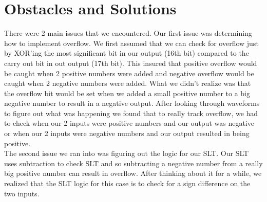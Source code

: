 \documentclass[11pt]{article}
\begin{document}
\section*{Obstacles and Solutions}
There were 2 main issues that we encountered. Our first issue was determining how to implement overflow. We first assumed that we can check for overflow just by XOR'ing the most significant bit in our output (16th bit) compared to the carry out bit  in out output (17th bit). This insured that positive overflow would be caught when 2 positive numbers were added and negative overflow would be caught when 2 negative numbers were added. What we didn't realize was that the overflow bit would be set when we added a small positive number to a big negative number  to result in a negative output. After looking through waveforms to figure out what was happening we found that to really track overflow, we had to check when our 2 inputs were positive numbers and our output was negative or when our 2 inputs were negative numbers and our output resulted in being positive. \\
The second issue we ran into was figuring out the logic for our SLT. Our SLT uses subtraction to check SLT and so subtracting a negative number from a really big positive number can result in overflow. After thinking about it for a while, we realized that the SLT logic for this case is to check for a sign difference on the two inputs. 
\end{document}
